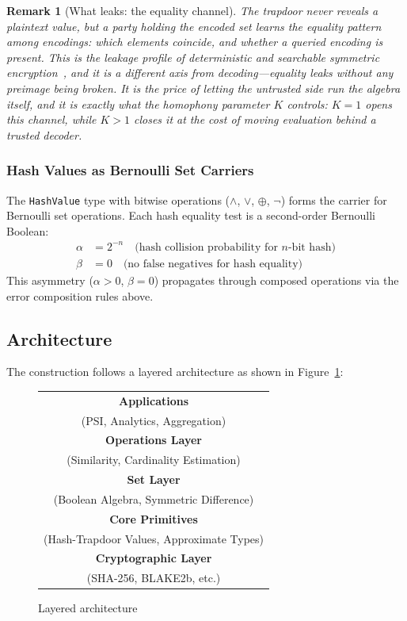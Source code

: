 \documentclass[10pt,conference]{IEEEtran}
\newtheorem{remark}[theorem]{Remark}
\newcommand{\fpr}{\alpha}                   %
\newcommand{\fnr}{\beta}                    %
\begin{document}
\begin{remark}[What leaks: the equality channel]
\label{rem:concession}
The trapdoor never reveals a plaintext value, but a party holding the encoded set learns the \emph{equality pattern} among encodings: which elements coincide, and whether a queried encoding is present. This is the leakage profile of deterministic and searchable symmetric encryption~\cite{curtmola2006searchable}, and it is a different axis from decoding---equality leaks without any preimage being broken. It is the price of letting the untrusted side run the algebra itself, and it is exactly what the homophony parameter $K$ controls: $K = 1$ opens this channel, while $K > 1$ closes it at the cost of moving evaluation behind a trusted decoder.
\end{remark}

\subsubsection{Hash Values as Bernoulli Set Carriers}

The \texttt{HashValue} type with bitwise operations ($\land$, $\lor$, $\oplus$, $\neg$) forms the carrier for Bernoulli set operations. Each hash equality test is a second-order Bernoulli Boolean:
\begin{align}
\fpr &= 2^{-n} \quad \text{(hash collision probability for $n$-bit hash)} \\
\fnr &= 0 \quad \text{(no false negatives for hash equality)}
\end{align}
This asymmetry ($\fpr > 0$, $\fnr = 0$) propagates through composed operations via the error composition rules above.

\subsection{Architecture}

The construction follows a layered architecture as shown in Figure~\ref{fig:architecture}:

\begin{figure}[h]
\centering
\begin{tabular}{|c|}
\hline
\textbf{Applications} \\
(PSI, Analytics, Aggregation) \\
\hline
\textbf{Operations Layer} \\
(Similarity, Cardinality Estimation) \\
\hline
\textbf{Set Layer} \\
(Boolean Algebra, Symmetric Difference) \\
\hline
\textbf{Core Primitives} \\
(Hash-Trapdoor Values, Approximate Types) \\
\hline
\textbf{Cryptographic Layer} \\
(SHA-256, BLAKE2b, etc.) \\
\hline
\end{tabular}
\caption{Layered architecture}
\label{fig:architecture}
\end{figure}
\end{document}
